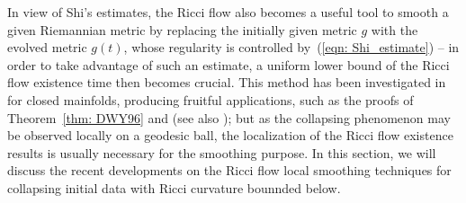 \documentclass[10pt,a4paper]{amsart}
\numberwithin{equation}{section}
\begin{document}
In view of Shi's estimates, the Ricci flow also becomes a useful tool to smooth
a given Riemannian metric by replacing the initially given metric $g$ with the
evolved metric $g(t)$, whose regularity is controlled by~(\ref{eqn:
Shi_estimate}) -- in order to take advantage of such an estimate, a uniform
lower bound of the Ricci flow existence time then becomes crucial. This method
has been investigated in \cite{DWY96} for closed mainfolds, producing fruitful
applications, such as the proofs of Theorem~\ref{thm: DWY96} and
\cite[Proposition 6.6]{NaberZhang} (see also \cite{PWY99}); but as the
collapsing phenomenon may be observed locally on a geodesic ball, the
localization of the Ricci flow existence results is usually necessary for the
smoothing purpose. In this section, we will discuss the recent developments on
the Ricci flow local smoothing techniques for collapsing initial data with
Ricci curvature bounnded below.
\end{document}
